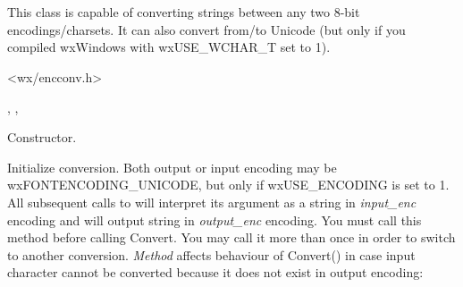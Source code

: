 %
%

\section{}\label{wxencodingconverter}

This class is capable of converting strings between any two
8-bit encodings/charsets. It can also convert from/to Unicode (but only
if you compiled wxWindows with wxUSE\_WCHAR\_T set to 1).




<wx/encconv.h>


, 
, 



\label{wxencodingconverterwxencodingconverter}


Constructor.

\label{wxencodingconverterinit}


Initialize conversion. Both output or input encoding may
be wxFONTENCODING\_UNICODE, but only if wxUSE\_ENCODING is set to 1.
All subsequent calls to  
will interpret its argument
as a string in {\it input\_enc} encoding and will output string in 
{\it output\_enc} encoding.
You must call this method before calling Convert. You may call 
it more than once in order to switch to another conversion.
{\it Method} affects behaviour of Convert() in case input character
cannot be converted because it does not exist in output encoding:

\begin{twocollist}\itemsep=0pt
\end{twocollist}

